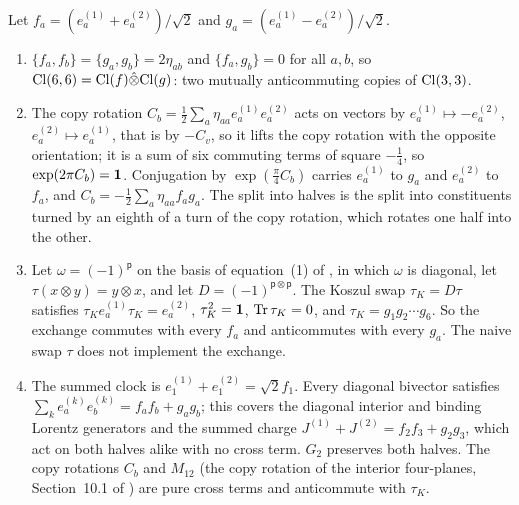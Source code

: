 \begin{proposition}
\label{d5:prop:cmrel}
Let $f_a=(e^{(1)}_a+e^{(2)}_a)/\sqrt2$ and $g_a=(e^{(1)}_a-e^{(2)}_a)/\sqrt2$.
\begin{enumerate}[label=(\roman*),leftmargin=2.2em]
\item $\{f_a,f_b\}=\{g_a,g_b\}=2\eta_{ab}$ and $\{f_a,g_b\}=0$ for all $a,b$, so $\mathrm{Cl}(6,6)=\mathrm{Cl}(f)\hat\otimes\mathrm{Cl}(g)$: two mutually anticommuting
copies of $\mathrm{Cl}(3,3)$.
\item The copy rotation $C_b=\tfrac12\sum_a\eta_{aa}e^{(1)}_ae^{(2)}_a$ acts on vectors by $e^{(1)}_a\mapsto-e^{(2)}_a$, $e^{(2)}_a\mapsto e^{(1)}_a$, that is by $-C_v$, so it lifts the copy rotation with the opposite orientation; it is a sum of
six commuting terms of square $-\tfrac14$, so $\exp(2\pi C_b)=\mathbf 1$. Conjugation by $\exp(\tfrac\pi4C_b)$ carries $e^{(1)}_a$ to $g_a$ and $e^{(2)}_a$ to
$f_a$, and $C_b=-\tfrac12\sum_a\eta_{aa}f_ag_a$. The split into halves is the split into constituents turned by an eighth of a turn of the
copy rotation, which rotates one half into the other.
\item Let $\omega=(-1)^{\mathsf p}$ on the basis of equation~(1) of \cite{ES17}, in which $\omega$ is diagonal, let $\tau(x\otimes y)=y\otimes x$, and let
$D=(-1)^{\mathsf p\otimes\mathsf p}$. The Koszul swap $\tau_K=D\tau$ satisfies $\tau_Ke^{(1)}_a\tau_K=e^{(2)}_a$, $\tau_K^2=\mathbf 1$, $\operatorname{Tr}\tau_K=0$, and
$\tau_K=g_1g_2\cdots g_6$. So the exchange commutes with every $f_a$ and anticommutes with every $g_a$. The naive swap $\tau$ does not implement
the exchange.
\item The summed clock is $e^{(1)}_1+e^{(2)}_1=\sqrt2f_1$. Every diagonal bivector satisfies $\sum_ke^{(k)}_ae^{(k)}_b=f_af_b+g_ag_b$; this covers the
diagonal interior and binding Lorentz generators and the summed charge $J^{(1)}+J^{(2)}=f_2f_3+g_2g_3$, which act on both halves alike
with no cross term. $G_2$ preserves both halves. The copy rotations $C_b$ and $M_{12}$ (the copy rotation of the interior four-planes, Section~10.1 of \cite{ES17}) are pure
cross terms and anticommute with $\tau_K$.
\end{enumerate}
\end{proposition}

